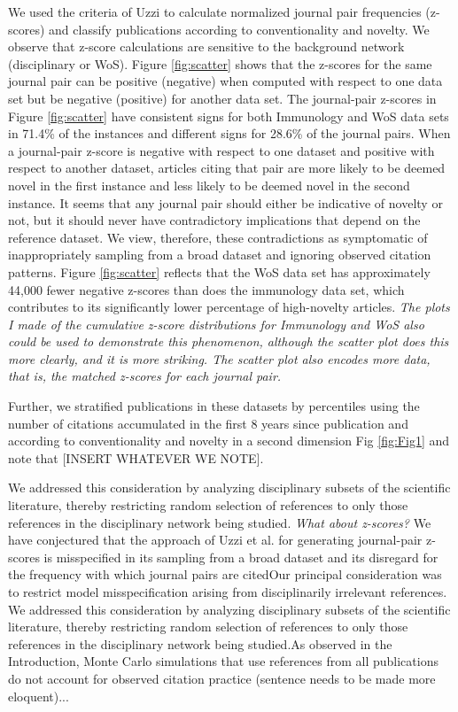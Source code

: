 \documentclass[NETN]{stjour}
\begin{document}
We used the criteria of Uzzi to calculate normalized journal pair frequencies (z-scores) and classify publications according to conventionality and novelty. We observe that z-score calculations are sensitive to the background network (disciplinary or WoS). Figure \ref{fig:scatter} shows that the z-scores for the same journal pair can be positive (negative) when computed with respect to one data set but be negative (positive) for another data set. The journal-pair z-scores in Figure \ref{fig:scatter} have consistent signs for both Immunology and WoS data sets in 71.4\% of the instances and different signs for 28.6\% of the journal pairs. When a journal-pair z-score is negative with respect to one dataset and positive with respect to another dataset, articles citing that pair are more likely to be deemed novel in the first instance and less likely to be deemed novel in the second instance.  It seems that any journal pair should either be indicative of novelty or not, but it should never have contradictory implications that depend on the reference dataset. We view, therefore, these contradictions as symptomatic of inappropriately sampling from a broad dataset and ignoring observed citation patterns.  Figure \ref{fig:scatter} reflects that the WoS data set has approximately 44,000 fewer negative z-scores than does the immunology data set, which contributes to its significantly lower percentage of high-novelty articles.  \emph{The plots I made of the cumulative z-score distributions for Immunology and WoS also could be used to demonstrate this phenomenon, although the scatter plot does this more clearly, and it is more striking.  The scatter plot also encodes more data, that is, the matched z-scores for each journal pair.}

Further, we stratified publications in these datasets by percentiles using the number of citations accumulated in the first 8 years since publication and according to conventionality and novelty in a second dimension Fig \ref{fig:Fig1} and note that [INSERT WHATEVER WE NOTE].




We addressed this consideration by analyzing disciplinary subsets of the scientific literature, thereby restricting random selection of references to only those references in the disciplinary network being studied.
\emph{What about z-scores?} 
We have conjectured that the approach of Uzzi et al. for generating journal-pair z-scores is misspecified in its sampling from a broad dataset and its disregard for the frequency with which journal pairs are citedOur principal consideration was to restrict model misspecification arising from disciplinarily irrelevant references. We addressed this consideration by analyzing disciplinary subsets of the scientific literature, thereby restricting random selection of references to only those references in the disciplinary network being studied.As observed in the Introduction, Monte Carlo simulations that use references from all publications do not account for observed citation practice (sentence needs to be made more eloquent)...
\end{document}
